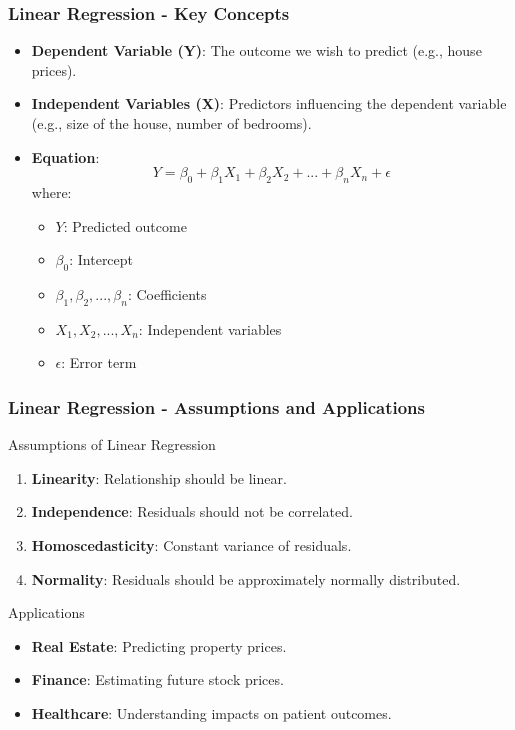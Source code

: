 \documentclass[aspectratio=169]{beamer}
\begin{document}
\begin{frame}[fragile]
    \frametitle{Linear Regression - Key Concepts}
    \begin{itemize}
        \item \textbf{Dependent Variable (Y)}: The outcome we wish to predict (e.g., house prices).
        \item \textbf{Independent Variables (X)}: Predictors influencing the dependent variable (e.g., size of the house, number of bedrooms).
        \item \textbf{Equation}:
        \begin{equation}
            Y = \beta_0 + \beta_1X_1 + \beta_2X_2 + ... + \beta_nX_n + \epsilon
        \end{equation}
        where:
        \begin{itemize}
            \item \( Y \): Predicted outcome
            \item \( \beta_0 \): Intercept
            \item \( \beta_1, \beta_2, ..., \beta_n \): Coefficients
            \item \( X_1, X_2, ..., X_n \): Independent variables
            \item \( \epsilon \): Error term
        \end{itemize}
    \end{itemize}
\end{frame}

\begin{frame}[fragile]
    \frametitle{Linear Regression - Assumptions and Applications}
    \begin{block}{Assumptions of Linear Regression}
        \begin{enumerate}
            \item \textbf{Linearity}: Relationship should be linear.
            \item \textbf{Independence}: Residuals should not be correlated.
            \item \textbf{Homoscedasticity}: Constant variance of residuals.
            \item \textbf{Normality}: Residuals should be approximately normally distributed.
        \end{enumerate}
    \end{block}

    \begin{block}{Applications}
        \begin{itemize}
            \item \textbf{Real Estate}: Predicting property prices.
            \item \textbf{Finance}: Estimating future stock prices.
            \item \textbf{Healthcare}: Understanding impacts on patient outcomes.
        \end{itemize}
    \end{block}
\end{frame}
\end{document}
